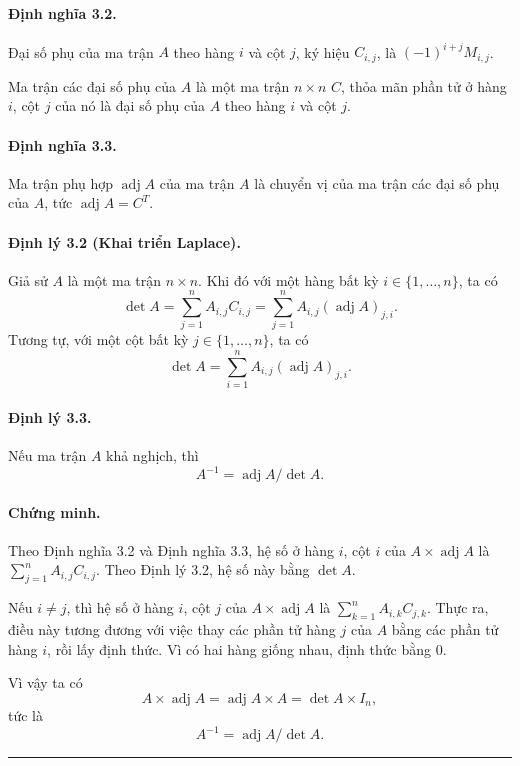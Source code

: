 \documentclass[11pt]{article}
\newcommand{\adj}{\operatorname{adj}}
\newcommand{\qedmark}{\hfill\rule{0.7ex}{0.7ex}}
\begin{document}
\paragraph{Định nghĩa 3.2.}
Đại số phụ của ma trận \(A\) theo hàng \(i\) và cột \(j\), ký hiệu \(C_{i,j}\),
là \((-1)^{i+j}M_{i,j}\).

Ma trận các đại số phụ của \(A\) là một ma trận \(n\times n\) \(C\), thỏa mãn
phần tử ở hàng \(i\), cột \(j\) của nó là đại số phụ của \(A\) theo hàng \(i\)
và cột \(j\).

\paragraph{Định nghĩa 3.3.}
Ma trận phụ hợp \(\adj A\) của ma trận \(A\) là chuyển vị của ma trận các đại
số phụ của \(A\), tức \(\adj A=C^T\).

\paragraph{Định lý 3.2 (Khai triển Laplace).}
Giả sử \(A\) là một ma trận \(n\times n\). Khi đó với một hàng bất kỳ
\(i\in\{1,\ldots,n\}\), ta có
\[
  \det A=\sum_{j=1}^{n}A_{i,j}C_{i,j}
        =\sum_{j=1}^{n}A_{i,j}(\adj A)_{j,i}.
\]
Tương tự, với một cột bất kỳ \(j\in\{1,\ldots,n\}\), ta có
\[
  \det A=\sum_{i=1}^{n}A_{i,j}(\adj A)_{j,i}.
\]

\paragraph{Định lý 3.3.}
Nếu ma trận \(A\) khả nghịch, thì
\[
  A^{-1}=\adj A/\det A.
\]

\paragraph{Chứng minh.}
Theo Định nghĩa 3.2 và Định nghĩa 3.3, hệ số ở hàng \(i\), cột \(i\) của
\(A\times\adj A\) là \(\sum_{j=1}^{n}A_{i,j}C_{i,j}\). Theo Định lý 3.2, hệ số
này bằng \(\det A\).

Nếu \(i\ne j\), thì hệ số ở hàng \(i\), cột \(j\) của \(A\times\adj A\) là
\(\sum_{k=1}^{n}A_{i,k}C_{j,k}\). Thực ra, điều này tương đương với việc thay
các phần tử hàng \(j\) của \(A\) bằng các phần tử hàng \(i\), rồi lấy định
thức. Vì có hai hàng giống nhau, định thức bằng \(0\).

Vì vậy ta có
\[
  A\times\adj A=\adj A\times A=\det A\times I_n,
\]
tức là
\[
  A^{-1}=\adj A/\det A.
\]
\qedmark
\end{document}
